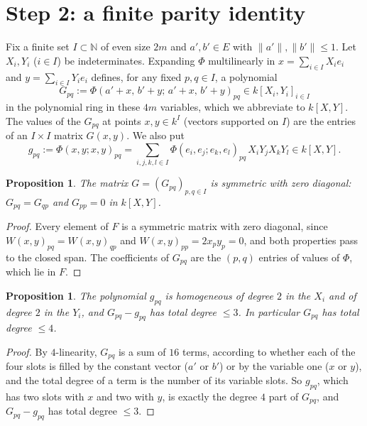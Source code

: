 \documentclass[11pt]{amsart}
\newtheorem{proposition}[theorem]{Proposition}
\theoremstyle{remark}
\newcommand{\kk}{k}
\newcommand{\N}{\mathbb{N}}
\newcommand{\norm}[1]{\lVert #1\rVert}
\newcommand{\1}{\mathbf{1}}
\begin{document}
\section{Step 2: a finite parity identity}
Fix a finite set $I\subset\N$ of even size $2m$ and $a',b'\in E$ with $\norm{a'},\norm{b'}\le1$. Let
$X_i,Y_i$ ($i\in I$) be indeterminates. Expanding $\Phi$ multilinearly in $x=\sum_{i\in I}X_ie_i$ and $y=\sum_{i\in I}Y_ie_i$
defines, for any fixed $p,q\in I$, a polynomial
\[
G_{pq}:=\Phi(a'+x,\,b'+y;\,a'+x,\,b'+y)_{pq}\in\kk[X_i,Y_i]_{i\in I}
\]
in the polynomial ring in these $4m$ variables, which we abbreviate to $\kk[X,Y]$. The values of the $G_{pq}$ at points $x,y\in\kk^I$ (vectors supported on $I$) are the entries of an $I\times I$ matrix $G(x,y)$. We also put
\[
g_{pq}:=\Phi(x,y;x,y)_{pq}=\sum_{i,j,k,l\in I}\Phi(e_i,e_j;e_k,e_l)_{pq}\,X_iY_jX_kY_l\in\kk[X,Y] .
\]

\begin{proposition}\label{prop:symm}
The matrix $G=(G_{pq})_{p,q\in I}$ is symmetric with zero diagonal: $G_{pq}=G_{qp}$ and $G_{pp}=0$ in $\kk[X,Y]$.
\end{proposition}
\begin{proof}
Every element of $F$ is a symmetric matrix with zero diagonal, since $W(x,y)_{pq}=W(x,y)_{qp}$ and
$W(x,y)_{pp}=2x_py_p=0$, and both properties pass to the closed span. The coefficients of $G_{pq}$ are the $(p,q)$ entries
of values of $\Phi$, which lie in $F$.
\end{proof}

\begin{proposition}\label{prop:top}
The polynomial $g_{pq}$ is homogeneous of degree $2$ in the $X_i$ and of degree $2$ in the $Y_i$, and $G_{pq}-g_{pq}$ has
total degree $\le3$. In particular $G_{pq}$ has total degree $\le4$.
\end{proposition}
\begin{proof}
By $4$-linearity, $G_{pq}$ is a sum of $16$ terms, according to whether each of the four slots is filled by the constant
vector ($a'$ or $b'$) or by the variable one ($x$ or $y$), and the total degree of a term is the number of its variable
slots. So $g_{pq}$, which has two slots with $x$ and two with $y$, is exactly the degree $4$ part of $G_{pq}$, and
$G_{pq}-g_{pq}$ has total degree $\le3$.
\end{proof}
\end{document}
